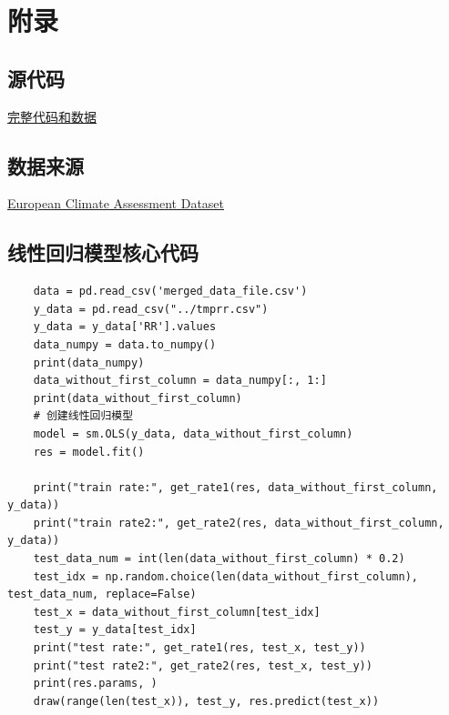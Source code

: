 \documentclass[UTF8, a4paper]{ctexart}
\begin{document}

\appendix
\setcounter{secnumdepth}{-2}
\section{附录}

\setcounter{secnumdepth}{3}
\subsection{源代码}

\href{https://github.com/limuy2022/math_model}{完整代码和数据}

\subsection{数据来源}\label{data}

\href{https://www.ecad.eu/}{European Climate Assessment  Dataset}

\subsection{线性回归模型核心代码}\label{liner_program}

\begin{lstlisting}
	data = pd.read_csv('merged_data_file.csv')
	y_data = pd.read_csv("../tmprr.csv")
	y_data = y_data['RR'].values
	data_numpy = data.to_numpy()
	print(data_numpy)
	data_without_first_column = data_numpy[:, 1:]
	print(data_without_first_column)
	# 创建线性回归模型
	model = sm.OLS(y_data, data_without_first_column)
	res = model.fit()
	
	print("train rate:", get_rate1(res, data_without_first_column, y_data))
	print("train rate2:", get_rate2(res, data_without_first_column, y_data))
	test_data_num = int(len(data_without_first_column) * 0.2)
	test_idx = np.random.choice(len(data_without_first_column), test_data_num, replace=False)
	test_x = data_without_first_column[test_idx]
	test_y = y_data[test_idx]
	print("test rate:", get_rate1(res, test_x, test_y))
	print("test rate2:", get_rate2(res, test_x, test_y))
	print(res.params, )
	draw(range(len(test_x)), test_y, res.predict(test_x))
\end{lstlisting}
\end{document}
